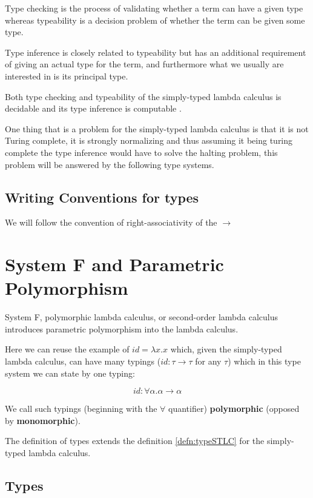 Type checking is the process of validating whether a term can have a given type whereas typeability is a decision problem of whether the term can be given some type.

Type inference is closely related to typeability but has an additional requirement of giving an actual type for the term, and furthermore what we usually are interested in is its principal type.

Both type checking and typeability of the simply-typed lambda calculus is decidable and its type inference is computable \cite{barendregt1992lambda}.

One thing that is a problem for the simply-typed lambda calculus is that it is not Turing complete, it is strongly normalizing \cite{barendregt1992lambda} and thus assuming it being turing complete the type inference would have to solve the halting problem, this problem will be answered by the following type systems.

\subsection{Writing Conventions for types}

We will follow the convention of right-associativity of the $\rightarrow$

\section{System F and Parametric Polymorphism}

System F, polymorphic lambda calculus, or second-order lambda calculus introduces parametric polymorphism into the lambda calculus.

Here we can reuse the example of $id = \lambda x . x$ which, given the simply-typed lambda calculus, can have many typings ($id : \tau \rightarrow \tau$ for any $\tau$) which in this type system we can state by one typing:

$$id : \forall \alpha . \alpha \rightarrow \alpha$$

We call such typings (beginning with the $\forall$ quantifier) \textbf{polymorphic} (opposed by \textbf{monomorphic}).

The definition of types extends the definition \ref{defn:typeSTLC} for the simply-typed lambda calculus.

\subsection{Types}

